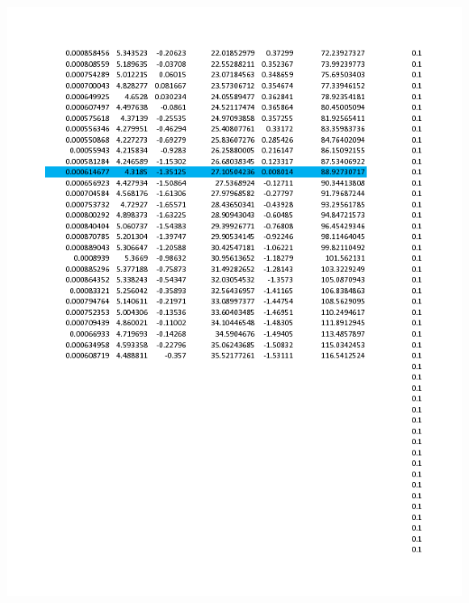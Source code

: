 \documentclass{article}
\begin{document}
\begin{minipage}{0.5\linewidth}
	\includegraphics[width = \textwidth]{glider_trajectory-6.png}
\end{minipage}
\end{document}
